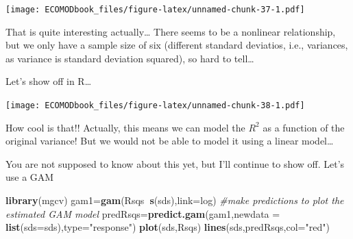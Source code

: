 \documentclass[
]{book}
\newenvironment{Shaded}{\begin{snugshade}}{\end{snugshade}}
\newcommand{\CommentTok}[1]{\textcolor[rgb]{0.56,0.35,0.01}{\textit{#1}}}
\newcommand{\ControlFlowTok}[1]{\textcolor[rgb]{0.13,0.29,0.53}{\textbf{#1}}}
\newcommand{\DataTypeTok}[1]{\textcolor[rgb]{0.13,0.29,0.53}{#1}}
\newcommand{\DecValTok}[1]{\textcolor[rgb]{0.00,0.00,0.81}{#1}}
\newcommand{\FloatTok}[1]{\textcolor[rgb]{0.00,0.00,0.81}{#1}}
\newcommand{\KeywordTok}[1]{\textcolor[rgb]{0.13,0.29,0.53}{\textbf{#1}}}
\newcommand{\NormalTok}[1]{#1}
\newcommand{\OperatorTok}[1]{\textcolor[rgb]{0.81,0.36,0.00}{\textbf{#1}}}
\newcommand{\StringTok}[1]{\textcolor[rgb]{0.31,0.60,0.02}{#1}}
\begin{document}
\texttt{[image: ECOMODbook\_files/figure-latex/unnamed-chunk-37-1.pdf]}

That is quite interesting actually\ldots{} There seems to be a nonlinear relationship, but we only have a sample size of six (different standard deviatios, i.e., variances, as variance is standard deviation squared), so hard to tell\ldots{}

Let's show off in R\ldots{}

\begin{Shaded}
\end{Shaded}

\texttt{[image: ECOMODbook\_files/figure-latex/unnamed-chunk-38-1.pdf]}

How cool is that!! Actually, this means we can model the \(R^2\) as a function of the original variance! But we would not be able to model it using a linear model\ldots{}

You are not supposed to know about this yet, but I'll continue to show off. Let's use a GAM

\begin{Shaded}
\begin{Highlighting}[]
\KeywordTok{library}\NormalTok{(mgcv)}
\NormalTok{gam1=}\KeywordTok{gam}\NormalTok{(Rsqs}\OperatorTok{~}\KeywordTok{s}\NormalTok{(sds),}\DataTypeTok{link=}\NormalTok{log)}
\CommentTok{#make predictions to plot the estimated GAM model}
\NormalTok{predRsqs=}\KeywordTok{predict.gam}\NormalTok{(gam1,}\DataTypeTok{newdata =} \KeywordTok{list}\NormalTok{(}\DataTypeTok{sds=}\NormalTok{sds),}\DataTypeTok{type=}\StringTok{"response"}\NormalTok{)}
\KeywordTok{plot}\NormalTok{(sds,Rsqs)}
\KeywordTok{lines}\NormalTok{(sds,predRsqs,}\DataTypeTok{col=}\StringTok{"red"}\NormalTok{)}
\end{Highlighting}
\end{Shaded}
\end{document}
